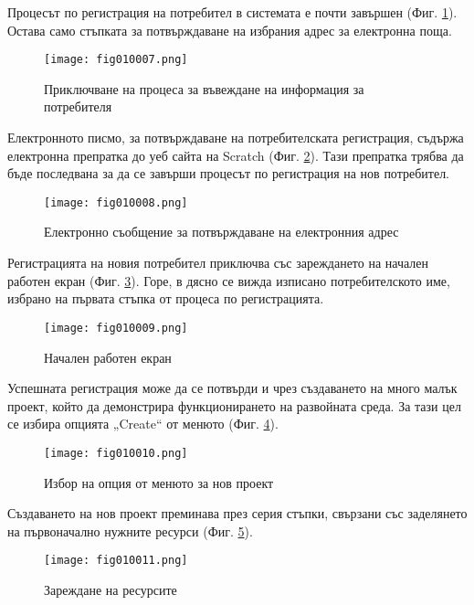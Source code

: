 Процесът по регистрация на потребител в системата е почти завършен (Фиг. \ref{fig010007}). Остава само стъпката за потвърждаване на избрания адрес за електронна поща.

\begin{figure}[H]
  \centering
  \texttt{[image: fig010007.png]}
  \caption{Приключване на процеса за въвеждане на информация за потребителя}
\label{fig010007}
\end{figure}

Електронното писмо, за потвърждаване на потребителската регистрация, съдържа електронна препратка до уеб сайта на Scratch (Фиг. \ref{fig010008}). Тази препратка трябва да бъде последвана за да се завърши процесът по регистрация на нов потребител. 

\begin{figure}[H]
  \centering
  \texttt{[image: fig010008.png]}
  \caption{Електронно съобщение за потвърждаване на електронния адрес}
\label{fig010008}
\end{figure}

Регистрацията на новия потребител приключва със зареждането на начален работен екран (Фиг. \ref{fig010009}). Горе, в дясно се вижда изписано потребителското име, избрано на първата стъпка от процеса по регистрацията.

\begin{figure}[H]
  \centering
  \texttt{[image: fig010009.png]}
  \caption{Начален работен екран}
\label{fig010009}
\end{figure}

Успешната регистрация може да се потвърди и чрез създаването на много малък проект, който да демонстрира функционирането на развойната среда. За тази цел се избира опцията „Create“ от менюто (Фиг. \ref{fig010010}).

\begin{figure}[H]
  \centering
  \texttt{[image: fig010010.png]}
  \caption{Избор на опция от менюто за нов проект}
\label{fig010010}
\end{figure}

Създаването на нов проект преминава през серия стъпки, свързани със заделянето на първоначално нужните ресурси (Фиг. \ref{fig010011}).

\begin{figure}[H]
  \centering
  \texttt{[image: fig010011.png]}
  \caption{Зареждане на ресурсите}
\label{fig010011}
\end{figure}

